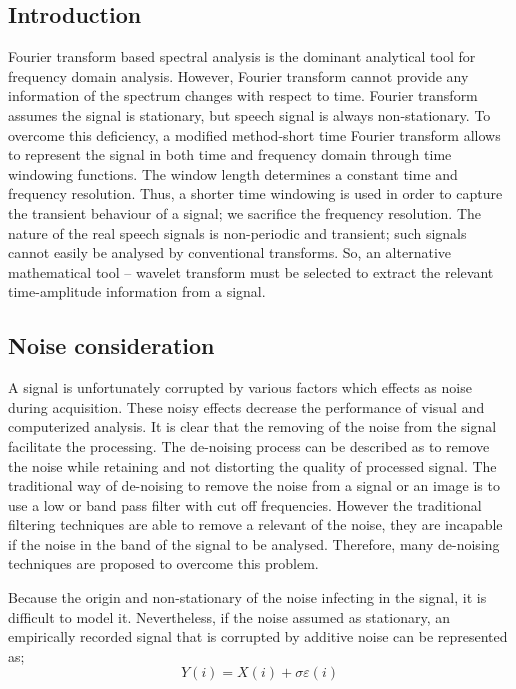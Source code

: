 \documentclass[12pt, a4paper, twoside]{report}
\begin{document}
\subsection{Introduction}
Fourier transform based spectral analysis is the dominant analytical tool for frequency domain analysis. However, Fourier transform cannot provide any information of the spectrum changes with respect to time. Fourier transform assumes the signal is stationary, but speech signal is always non-stationary. To overcome this deficiency, a modified method-short time Fourier transform allows to represent the signal in both time and frequency domain through time windowing functions. The window length determines a constant time and frequency resolution. Thus, a shorter time windowing is used in order to capture the transient behaviour of a signal; we sacrifice the frequency resolution. The nature of the real speech signals is non-periodic and transient; such signals cannot easily be analysed by conventional transforms. So, an alternative mathematical tool – wavelet transform must be selected to extract the relevant time-amplitude information from a signal.
\subsection{Noise consideration}
A signal is unfortunately corrupted by various factors which effects as noise during acquisition. These noisy effects decrease the performance of visual and computerized analysis. It is clear that the removing of the noise from the signal facilitate the processing. The de-noising process can be described as to remove the noise while retaining and not distorting the quality of processed signal. The traditional way of de-noising to remove the noise from a signal or an image is to use a low or band pass filter with cut off frequencies. However the traditional filtering techniques are able to remove a relevant of the noise, they are incapable if the noise in the band of the signal to be analysed. Therefore, many de-noising techniques are proposed to overcome this problem.
\par
Because the origin and non-stationary of the noise infecting in  the signal, it is difficult to model it. Nevertheless, if the noise assumed as stationary, an empirically recorded signal that is corrupted by additive noise can be represented as;
\begin{equation}
Y(i) = X(i) + \sigma \varepsilon(i)
\end{equation}
\end{document}
